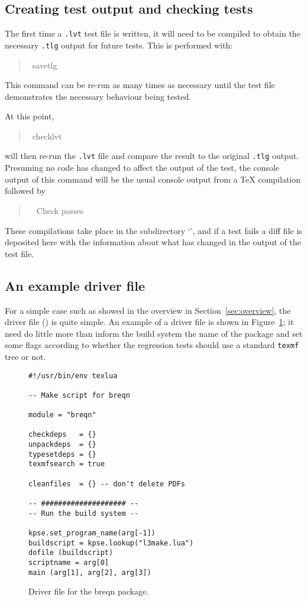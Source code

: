 \documentclass[a4paper]{ltugboat}
\begin{document}
\subsection{Creating test output and checking tests}

The first time a \texttt{.lvt} test file is written, it will need to be compiled to obtain the necessary \texttt{.tlg} output for future tests.
This is performed with:
\begin{quote}\ttfamily
\execname~savetlg~
\end{quote}
This command can be re-run as many times as necessary until the test file demonstrates the necessary behaviour being tested.

At this point, 
\begin{quote}\ttfamily
\execname~checklvt~
\end{quote}
will then re-run the \texttt{.lvt} file and compare the result to the original \texttt{.tlg} output.
Presuming no code has changed to affect the output of the test, the console output of this command will be the usual console output from a \TeX{} compilation followed by
\begin{quote}\ttfamily
~~Check passes
\end{quote}
These compilations take place in the subdirectory `\texttt{\compdirname}', and if a test fails a diff file is deposited here with the information about what has changed in the output of the test file.

\subsection{An example driver file}
\label{sec:example}

For a simple case such as showed in the overview in Section~\ref{sec:overview}, the driver file (\texttt{\drivername}) is quite simple.
An example of a driver file is shown in Figure~\ref{fig:driver}; it need do little more than inform the build system the name of the package and set some flags according to whether the regression tests should use a standard \texttt{texmf} tree or not.

\begin{figure}
\begin{Verbatim}[frame=single,fontsize=\small]
#!/usr/bin/env texlua

-- Make script for breqn

module = "breqn"

checkdeps   = {}
unpackdeps  = {}
typesetdeps = {}
texmfsearch = true

cleanfiles  = {} -- don't delete PDFs

-- #################### --
-- Run the build system --

kpse.set_program_name(arg[-1])
buildscript = kpse.lookup("l3make.lua")
dofile (buildscript)
scriptname = arg[0]
main (arg[1], arg[2], arg[3])
\end{Verbatim}
\caption{Driver file for the \textsf{breqn} package.}
\label{fig:driver}
\end{figure}
\end{document}
